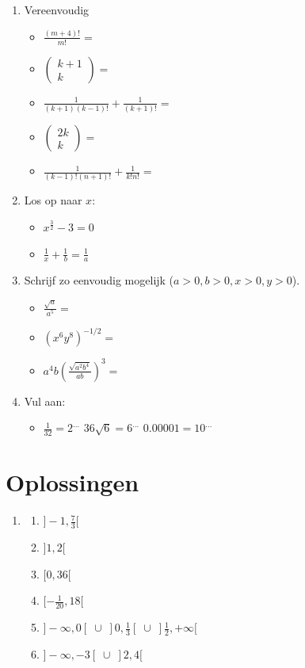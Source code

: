 \documentclass[11pt]{article}
\newcommand{\ds}{\displaystyle}
\begin{document}
{\begin{enumerate}
\item Vereenvoudig
\begin{itemize}
\item $\ds \frac{(m+4)!}{m!} =$
\item $\left( \begin{array}{c} k+1 \\ k \end{array} \right) =$
\item $\ds \frac{1}{(k+1) (k-1)!} + \frac{1}{(k+1)!} =$
\item $\left( \begin{array}{c} 2k \\ k \end{array} \right) =$
\item $\ds \frac{1}{(k-1)! (n+1)!} + \frac{1}{k! n!} =$
\end{itemize}

\item Los op naar $x$:
\begin{itemize}
\item $\ds x^{\frac32} -3 = 0$
\item $\ds \frac{1}{x} + \frac{1}{b} = \frac{1}{a}$
\end{itemize}

\item Schrijf zo eenvoudig mogelijk ($a>0, b>0, x>0, y>0$).
\begin{itemize}
\item $\ds{\frac{\sqrt{a}}{a^{5}}=}$
\item $\ds{\left(x^{6}y^{8}\right)^{-1/2}=}$
\item $\ds{a^{4}b\left(\frac{\sqrt{a^{2}b^{4}}}{ab}\right)^{3}=}$
\end{itemize}

\item Vul aan:
\begin{itemize}
\item $\displaystyle \frac{1}{32} = 2^{...}$  \hspace{2cm}
$\displaystyle 36 \sqrt6 = 6^{...}$ \hspace{2cm} $0.00001 =
10^{...}$
\end{itemize}


\end{enumerate}
\section*{Oplossingen}

\begin{enumerate}
\item
\begin{enumerate}
\item $]-1,\frac73[$
\item $]1 , 2[$
\item $[0,36[$
\item $[ - \frac{1}{20} , 18 [$
\item $]-\infty, 0[\;\cup \;]0, \ds\frac{1}{3}[\;\cup\;
]\ds\frac{1}{2},+\infty[$
\item $]- \infty, -3 [ \;\cup\; ] 2,4[$


\end{enumerate}
\end{enumerate}}
\end{document}

